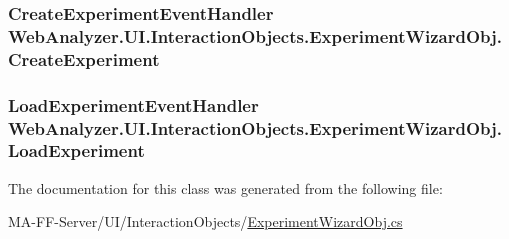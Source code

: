 \subsubsection[{Create\+Experiment}]{\setlength{\rightskip}{0pt plus 5cm}Create\+Experiment\+Event\+Handler Web\+Analyzer.\+U\+I.\+Interaction\+Objects.\+Experiment\+Wizard\+Obj.\+Create\+Experiment}\label{class_web_analyzer_1_1_u_i_1_1_interaction_objects_1_1_experiment_wizard_obj_a95676a614efb19092a4522290e47ef96}
\hypertarget{class_web_analyzer_1_1_u_i_1_1_interaction_objects_1_1_experiment_wizard_obj_a4ab54f4e59198b7ff3e9b91ad5049642}{}
\subsubsection[{Load\+Experiment}]{\setlength{\rightskip}{0pt plus 5cm}Load\+Experiment\+Event\+Handler Web\+Analyzer.\+U\+I.\+Interaction\+Objects.\+Experiment\+Wizard\+Obj.\+Load\+Experiment}\label{class_web_analyzer_1_1_u_i_1_1_interaction_objects_1_1_experiment_wizard_obj_a4ab54f4e59198b7ff3e9b91ad5049642}


The documentation for this class was generated from the following file\+:\begin{DoxyCompactItemize}
\item 
M\+A-\/\+F\+F-\/\+Server/\+U\+I/\+Interaction\+Objects/\hyperlink{_experiment_wizard_obj_8cs}{Experiment\+Wizard\+Obj.\+cs}\end{DoxyCompactItemize}
